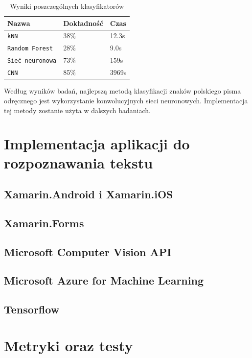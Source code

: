 \documentclass[brudnopis]{xmgr}
\begin{document}
\begin{table}[!htb]
\begin{tabular}{|l|l|l|} \hline
Nazwa & Dokładność      & Czas \\ \hline
\texttt{kNN} & 38\% & 12.3s \\ \hline
\texttt{Random Forest}        & 28\% & 9.0s \\ \hline
\texttt{Sieć neuronowa}     & 73\% & 159s \\ \hline
\texttt{CNN}     & 85\% &  3969s \\ \hline
\end{tabular}
\caption{Wyniki poszczególnych klasyfikatorów}
\end{table}

Według wyników badań, najlepszą metodą klasyfikacji znaków polskiego pisma odręcznego jest wykorzystanie konwolucyjnych sieci neuronowych. Implementacja tej metody zostanie użyta w dalszych badaniach.

\chapter{Implementacja aplikacji do rozpoznawania tekstu}

\section{Xamarin.Android i Xamarin.iOS}

\section{Xamarin.Forms}

\section{Microsoft Computer Vision API}

\section{Microsoft Azure for Machine Learning}

\section{Tensorflow}

\chapter{Metryki oraz testy}
\end{document}
